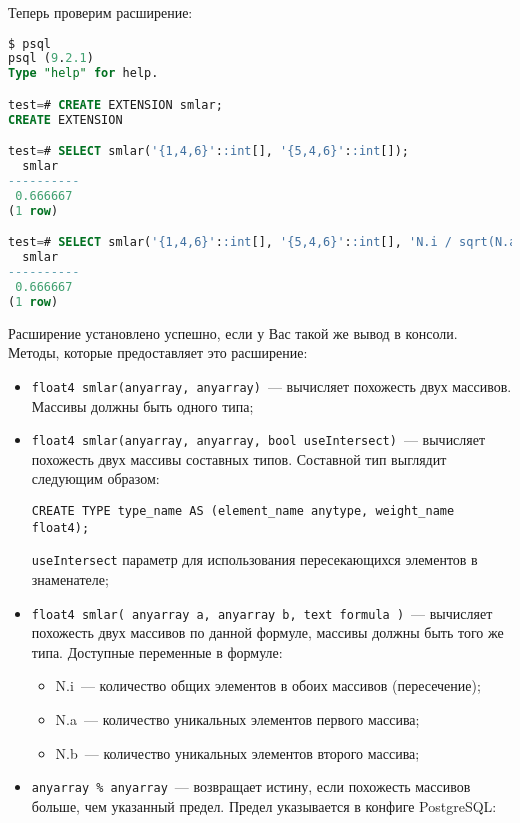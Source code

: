 Теперь проверим расширение:

\begin{lstlisting}[language=SQL,label=lst:smlar4,caption=Проверка smlar]
$ psql
psql (9.2.1)
Type "help" for help.

test=# CREATE EXTENSION smlar;
CREATE EXTENSION

test=# SELECT smlar('{1,4,6}'::int[], '{5,4,6}'::int[]);
  smlar
----------
 0.666667
(1 row)

test=# SELECT smlar('{1,4,6}'::int[], '{5,4,6}'::int[], 'N.i / sqrt(N.a * N.b)' );
  smlar
----------
 0.666667
(1 row)
\end{lstlisting}

Расширение установлено успешно, если у Вас такой же вывод в консоли. Методы, которые предоставляет это расширение:

\begin{itemize}
  \item \lstinline!float4 smlar(anyarray, anyarray)!~--- вычисляет похожесть двух массивов. Массивы должны быть одного типа;
  \item \lstinline!float4 smlar(anyarray, anyarray, bool useIntersect)!~--- вычисляет похожесть двух массивы составных типов. Составной тип выглядит следующим образом:

\begin{lstlisting}[label=lst:smlar5,caption=Составной тип]
CREATE TYPE type_name AS (element_name anytype, weight_name float4);
\end{lstlisting}

  \lstinline!useIntersect! параметр для использования пересекающихся элементов в знаменателе;
  \item \lstinline!float4 smlar( anyarray a, anyarray b, text formula )!~--- вычисляет похожесть двух массивов по данной формуле, массивы должны быть того же типа. Доступные переменные в формуле:

    \begin{itemize}
      \item N.i~--- количество общих элементов в обоих массивов (пересечение);
      \item N.a~--- количество уникальных элементов первого массива;
      \item N.b~--- количество уникальных элементов второго массива;
    \end{itemize}

  \item \lstinline!anyarray % anyarray!~--- возвращает истину, если похожесть массивов больше, чем указанный предел. Предел указывается в конфиге PostgreSQL:


\end{itemize}
